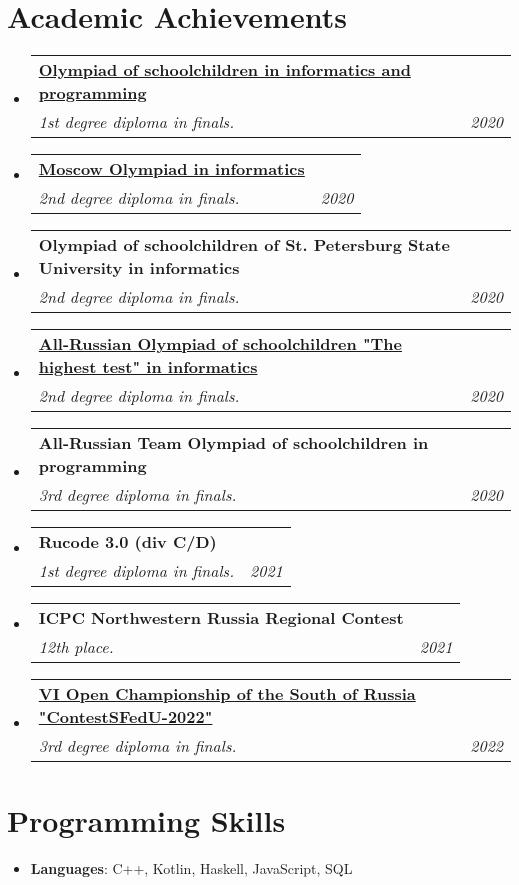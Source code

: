 \documentclass[letterpaper,11pt]{article}
\makeatletter
\newcommand{\resumeSubheading}[4]{
  \vspace{-1pt}\item
    \begin{tabular*}{0.97\textwidth}{l@{\extracolsep{\fill}}r}
      \textbf{#1} & #2 \\
      \textit{\small#3} & \textit{\small #4} \\
    \end{tabular*}\vspace{-5pt}
}
\newcommand{\resumeSubHeadingListStart}{\begin{itemize}[leftmargin=*]}
\newcommand{\resumeSubHeadingListEnd}{\end{itemize}}
\makeatother
\begin{document}
\section{Academic Achievements}
  \resumeSubHeadingListStart
    \resumeSubheading{\href{https://neerc.ifmo.ru/school/ioip/standings-2020.html}{Olympiad of schoolchildren in informatics and programming}}{}
    {1st degree diploma in finals.}{2020}
    \resumeSubheading{\href{https://mos-inf.olimpiada.ru/winners10-11-2020}{Moscow Olympiad in informatics}}{}
    {2nd degree diploma in finals.}{2020}
    \resumeSubheading{Olympiad of schoolchildren of St. Petersburg
State University in informatics}{}
    {2nd degree diploma in finals.}{2020}
    \resumeSubheading{\href{https://olymp.hse.ru/data/2020/04/03/1556029378/\%D0\%98\%D0\%BD\%D1\%84\%D0\%BE\%D1\%80\%D0\%BC\%D0\%B0\%D1\%82\%D0\%B8\%D0\%BA\%D0\%B0\%2011.pdf}{All-Russian Olympiad of schoolchildren "The highest test" in informatics}}{}
    {2nd degree diploma in finals.}{2020}
    \resumeSubheading{All-Russian Team Olympiad of schoolchildren in programming}{}
    {3rd degree diploma in finals.}{2020}
    \resumeSubheading{Rucode 3.0 (div C/D)}{}
    {1st degree diploma in finals.}{2021}
    \resumeSubheading{ICPC Northwestern Russia Regional Contest}{}
    {12th place.}{2021}
    \resumeSubheading{\href{https://drive.google.com/file/d/1dGPclqfhc_l4tnlMMRX_VPl1Qzo_12aD/view}{VI Open Championship of the South of Russia "ContestSFedU-2022"}}{}
    {3rd degree diploma in finals.}{2022}
  \resumeSubHeadingListEnd
\section{Programming Skills}
  \resumeSubHeadingListStart
    \item{
      \textbf{Languages}{: C++, Kotlin, Haskell, JavaScript, SQL }
    }
  \resumeSubHeadingListEnd


\end{document}
